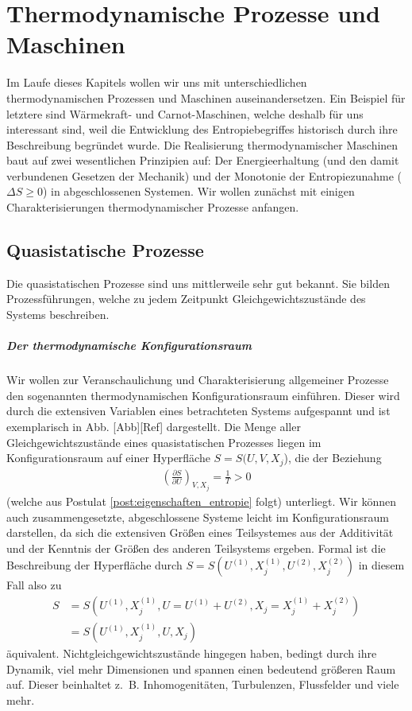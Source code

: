 
\chapter{Thermodynamische Prozesse und Maschinen}
Im Laufe dieses Kapitels wollen wir uns mit unterschiedlichen thermodynamischen Prozessen und Maschinen auseinandersetzen. Ein Beispiel für letztere sind Wärmekraft- und Carnot-Maschinen, welche deshalb für uns interessant sind, weil die Entwicklung des Entropiebegriffes historisch durch ihre Beschreibung begründet wurde.
Die Realisierung thermodynamischer Maschinen baut auf zwei wesentlichen Prinzipien auf: Der Energieerhaltung (und den damit verbundenen Gesetzen der Mechanik) und der Monotonie der Entropiezunahme ($\Delta S \geq 0$) in abgeschlossenen Systemen.
Wir wollen zunächst mit einigen Charakterisierungen thermodynamischer Prozesse anfangen.


\section{Quasistatische Prozesse}
Die quasistatischen Prozesse sind uns mittlerweile sehr gut bekannt. Sie bilden Prozessführungen, welche zu jedem Zeitpunkt Gleichgewichtszustände des Systems beschreiben.
\paragraph*{Der thermodynamische Konfigurationsraum}
Wir wollen zur Veranschaulichung und Charakterisierung allgemeiner Prozesse den sogenannten thermodynamischen Konfigurationsraum einführen. Dieser wird durch die extensiven Variablen eines betrachteten Systems aufgespannt und ist exemplarisch in Abb. [Abb][Ref] dargestellt.
Die Menge aller Gleichgewichtszustände eines quasistatischen Prozesses liegen im Konfigurationsraum auf einer Hyperfläche $S=S(U,V,X_j$), die der Beziehung 
\begin{align*}
    \left(\frac{\partial S}{\partial U}\right)_{V,X_j}=\frac{1}{T}>0
\end{align*}
(welche aus Postulat \ref{post:eigenschaften_entropie} folgt) unterliegt.  
Wir können auch zusammengesetzte, abgeschlossene Systeme leicht im Konfigurationsraum darstellen, da sich die extensiven Größen eines Teilsystemes aus der Additivität und der Kenntnis der Größen des anderen Teilsystems ergeben. Formal ist die Beschreibung der Hyperfläche durch $S=S(U^{(1)},X_j^{(1)},U^{(2)},X_j^{(2)})$ in diesem Fall also zu 
\begin{align*}
    S&=S(U^{(1)},X_j^{(1)},U=U^{(1)}+U^{(2)},X_j=X_j^{(1)}+X_j^{(2)})\\
    &=S(U^{(1)},X_j^{(1)},U,X_j)
\end{align*}
äquivalent.
Nichtgleichgewichtszustände hingegen haben, bedingt durch ihre Dynamik, viel mehr Dimensionen und spannen einen bedeutend größeren Raum auf. Dieser beinhaltet z.~B. Inhomogenitäten, Turbulenzen, Flussfelder und viele mehr. 

